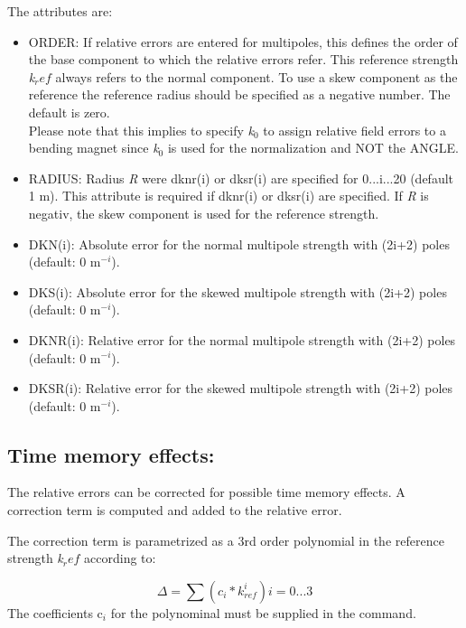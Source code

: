 The attributes are: 
\begin{itemize}
\item ORDER: If relative errors are entered for multipoles, this defines
  the order of the base component to which the relative  errors
  refer. This reference strength \textit{k$_ref$} always refers to the
  normal component. To use a skew component as the reference the
  reference radius should be specified as a negative number. The default
  is zero.  \\
  Please note that this implies to specify \textit{k$_0$} to assign
  relative field errors to a bending magnet since \textit{k$_0$} is used
  for the normalization and NOT the ANGLE.  

\item RADIUS: Radius \textit{R} were dknr(i) or dksr(i) are specified
  for 0...i...20 (default 1 m). This attribute is required if dknr(i) or
  dksr(i) are specified. If \textit{R} is negativ, the skew component is
  used for the reference strength.  

\item DKN(i): Absolute error for the normal multipole strength with
  (2i+2) poles (default: 0  m$^{-i}$).  

\item DKS(i): Absolute error for the skewed multipole strength with
  (2i+2) poles (default: 0  m$^{-i}$).  

\item DKNR(i): Relative error for the normal multipole strength with
  (2i+2) poles (default: 0  m$^{-i}$).  

\item DKSR(i): Relative error for the skewed multipole strength with
  (2i+2) poles (default: 0  m$^{-i}$).  
\end{itemize}


\subsection{Time memory effects:}

The relative errors can be corrected for possible time memory effects. A
correction term is computed and added to the relative error. 

The correction term is parametrized as a 3rd order polynomial in the
reference strength \textit{k$_ref$} according to:  

\[ \Delta = \sum (c_i * \textit{k}^{i}_{ref})            i = 0...3\]
The coefficients c$_i$ for the polynominal must be supplied in the
command.  


